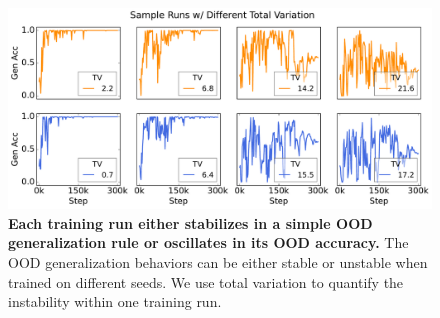 \begin{figure}[h]
    \centering
    \includegraphics[width=0.66\linewidth]{figures/sample_runs.pdf}
    \caption{\textbf{Each training run either stabilizes in a simple OOD generalization rule or oscillates in its OOD accuracy.} The OOD generalization behaviors can be either stable or unstable  when trained on different seeds. We use total variation to quantify the instability within one training run.}
    \label{fig:sample_runs}
\end{figure}

